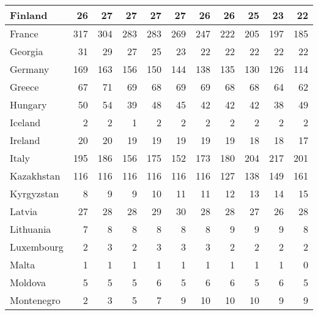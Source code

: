 \begin{table}
\begin{tabular}{|l|r|r|r|r|r|r|r|r|r|r|}
                       Finland&     26&     27&     27&     27&     27&     26&     26&     25&     23&     22\\\hline
                        France&    317&    304&    283&    283&    269&    247&    222&    205&    197&    185\\\hline
                       Georgia&     31&     29&     27&     25&     23&     22&     22&     22&     22&     22\\\hline
                       Germany&    169&    163&    156&    150&    144&    138&    135&    130&    126&    114\\\hline
                        Greece&     67&     71&     69&     68&     69&     69&     68&     68&     64&     62\\\hline
                       Hungary&     50&     54&     39&     48&     45&     42&     42&     42&     38&     49\\\hline
                       Iceland&      2&      2&      1&      2&      2&      2&      2&      2&      2&      2\\\hline
                       Ireland&     20&     20&     19&     19&     19&     19&     19&     18&     18&     17\\\hline
                         Italy&    195&    186&    156&    175&    152&    173&    180&    204&    217&    201\\\hline
                    Kazakhstan&    116&    116&    116&    116&    116&    116&    127&    138&    149&    161\\\hline
                    Kyrgyzstan&      8&      9&      9&     10&     11&     11&     12&     13&     14&     15\\\hline
                        Latvia&     27&     28&     28&     29&     30&     28&     28&     27&     26&     28\\\hline
                     Lithuania&      7&      8&      8&      8&      8&      8&      9&      9&      9&      8\\\hline
                    Luxembourg&      2&      3&      2&      3&      3&      3&      2&      2&      2&      2\\\hline
                         Malta&      1&      1&      1&      1&      1&      1&      1&      1&      1&      0\\\hline
                       Moldova&      5&      5&      5&      6&      5&      6&      6&      5&      6&      5\\\hline
                    Montenegro&      2&      3&      5&      7&      9&     10&     10&     10&      9&      9\\\hline

\end{tabular}
\end{table}
